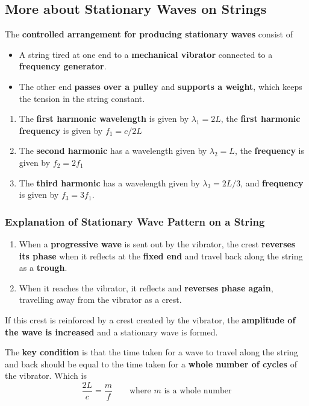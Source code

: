 \subsection{More about Stationary Waves on Strings}

The \textbf{controlled arrangement for producing stationary waves} consist of
\begin{itemize}
    \item A string tired at one end to a \textbf{mechanical vibrator} connected to a \textbf{frequency generator}.
    \item The other end \textbf{passes over a pulley} and \textbf{supports a weight}, which keeps the tension in the string constant.
\end{itemize}

\begin{enumerate}
    \item The \textbf{first harmonic wavelength} is given by $\lambda_1=2L$, the \textbf{first harmonic frequency} is given by $f_1=c/2L$
    \item The \textbf{second harmonic} has a wavelength given by $\lambda_2=L$, the \textbf{frequency} is given by $f_2=2f_1$
    \item The \textbf{third harmonic} has a wavelength given by $\lambda_3=2L/3$, and \textbf{frequency} is given by $f_3=3f_1$.
\end{enumerate}

\subsubsection*{Explanation of Stationary Wave Pattern on a String}
\begin{enumerate}
    \item When a \textbf{progressive wave} is sent out by the vibrator, the crest \textbf{reverses its phase} when it reflects at the \textbf{fixed end} and travel back along the string as a \textbf{trough}.
    \item When it reaches the vibrator, it reflects and \textbf{reverses phase again}, travelling away from the vibrator as a crest.
\end{enumerate}
If this crest is reinforced by a crest created by the vibrator, the \textbf{amplitude of the wave is increased} and a stationary wave is formed.

The \textbf{key condition} is that the time taken for a wave to travel along the string and back should be equal to the time taken for a \textbf{whole number of cycles} of the vibrator. Which is
$$\frac{2L}{c}=\frac{m}{f}\qquad\text{where $m$ is a whole number}$$

